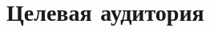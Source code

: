 \section{Целевая аудитория}

\begin{frame}
\frametitle{\insertsection} 
\framesubtitle{\insertsubsection}
\end{frame}
